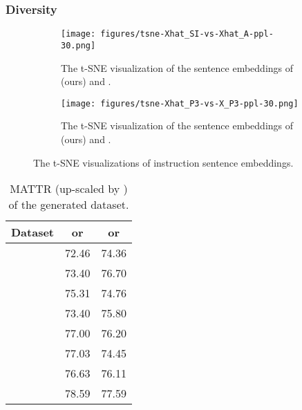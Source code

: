 \documentclass[11pt]{article}
\begin{document}
\subsubsection{Diversity}
\begin{figure}[t]
    \centering
    \begin{subfigure}[b]{0.23\textwidth}
        \texttt{[image: figures/tsne-Xhat\_SI-vs-Xhat\_A-ppl-30.png]}
        \caption{The t-SNE visualization of the sentence embeddings of \textcolor{blue}{}(ours) and \textcolor{red}{}.}
        \label{fig:gensiX_genalpacaX}
    \end{subfigure}
    \hfill
    \begin{subfigure}[b]{0.23\textwidth}
        \texttt{[image: figures/tsne-Xhat\_P3-vs-X\_P3-ppl-30.png]}
        \caption{The t-SNE visualization of the sentence embeddings of \textcolor{blue}{}(ours) and \textcolor{red}{}.}
        \label{fig:genpthree_origpthree}
    \end{subfigure}
    \caption{The t-SNE visualizations of instruction sentence embeddings.}
    \label{fig:inst_sent_embed}
\end{figure} \begin{table}[t]
\centering
\small
\begin{tabular}{@{}lcc@{}}
\toprule
Dataset        &  or   &  or  \\ \midrule
      & 72.46                           & 74.36                        \\
     & 73.40                           & 76.70                        \\
  & 75.31                           & 74.76                        \\
    & 73.40                           & 75.80                        \\
  & 77.00                           & 76.20                        \\
 & 77.03                           & 74.45                        \\
   & 76.63                           & 76.11                        \\ \midrule
        & 78.59                           & 77.59                        \\
\bottomrule
\end{tabular}
\caption{
    MATTR (up-scaled by ) of the generated dataset.
}
\label{tab:mattr}
\end{table} 
\end{document}
